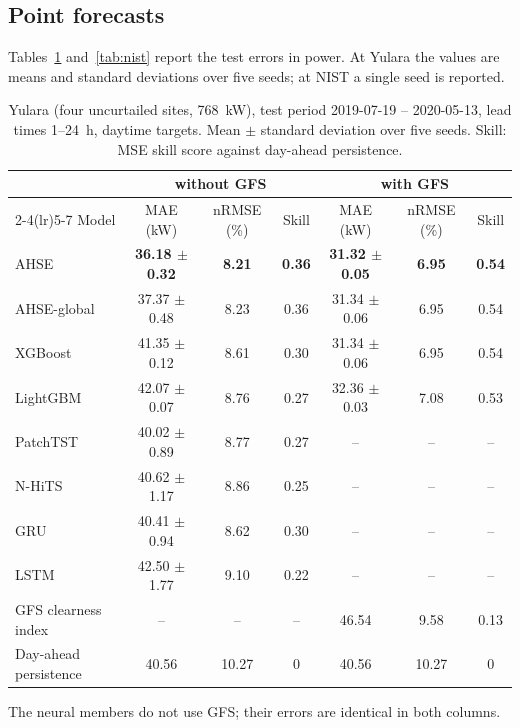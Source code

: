 
\subsection{Point forecasts}
\label{subsec:res_point}

Tables~\ref{tab:yulara} and~\ref{tab:nist} report the test errors in power. At Yulara the values
are means and standard deviations over five seeds; at NIST a single seed is reported.

\begin{table}[t]
  \centering
  \caption{Yulara (four uncurtailed sites, 768~kW), test period 2019-07-19 -- 2020-05-13, lead
  times 1--24~h, daytime targets. Mean $\pm$ standard deviation over five seeds. Skill: MSE
  skill score against day-ahead persistence.}
  \label{tab:yulara}
  \small
  \begin{tabular}{lcccccc}
    \toprule
    & \multicolumn{3}{c}{without GFS} & \multicolumn{3}{c}{with GFS} \\
    \cmidrule(lr){2-4}\cmidrule(lr){5-7}
    Model & MAE (kW) & nRMSE (\%) & Skill & MAE (kW) & nRMSE (\%) & Skill \\
    \midrule
    AHSE                   & \textbf{36.18 $\pm$ 0.32} & \textbf{8.21} & \textbf{0.36} & \textbf{31.32 $\pm$ 0.05} & \textbf{6.95} & \textbf{0.54} \\
    AHSE-global            & 37.37 $\pm$ 0.48 & 8.23 & 0.36 & 31.34 $\pm$ 0.06 & 6.95 & 0.54 \\
    XGBoost                & 41.35 $\pm$ 0.12 & 8.61 & 0.30 & 31.34 $\pm$ 0.06 & 6.95 & 0.54 \\
    LightGBM               & 42.07 $\pm$ 0.07 & 8.76 & 0.27 & 32.36 $\pm$ 0.03 & 7.08 & 0.53 \\
    PatchTST               & 40.02 $\pm$ 0.89 & 8.77 & 0.27 & -- & -- & -- \\
    N-HiTS                 & 40.62 $\pm$ 1.17 & 8.86 & 0.25 & -- & -- & -- \\
    GRU                    & 40.41 $\pm$ 0.94 & 8.62 & 0.30 & -- & -- & -- \\
    LSTM                   & 42.50 $\pm$ 1.77 & 9.10 & 0.22 & -- & -- & -- \\
    GFS clearness index    & -- & -- & -- & 46.54 & 9.58 & 0.13 \\
    Day-ahead persistence  & 40.56 & 10.27 & 0 & 40.56 & 10.27 & 0 \\
    \bottomrule
  \end{tabular}

  \smallskip
  \footnotesize The neural members do not use GFS; their errors are identical in both columns.
\end{table}

